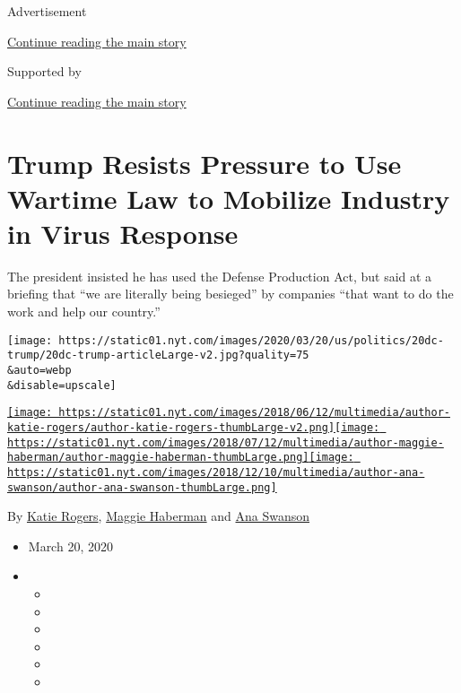 Advertisement

\protect\hyperlink{after-top}{Continue reading the main story}

Supported by

\protect\hyperlink{after-sponsor}{Continue reading the main story}

\hypertarget{trump-resists-pressure-to-use-wartime-law-to-mobilize-industry-in-virus-response}{%
\section{Trump Resists Pressure to Use Wartime Law to Mobilize Industry
in Virus
Response}\label{trump-resists-pressure-to-use-wartime-law-to-mobilize-industry-in-virus-response}}

The president insisted he has used the Defense Production Act, but said
at a briefing that ``we are literally being besieged'' by companies
``that want to do the work and help our country.''

\texttt{[image: https://static01.nyt.com/images/2020/03/20/us/politics/20dc-trump/20dc-trump-articleLarge-v2.jpg?quality=75\\\&auto=webp\\\&disable=upscale]}

\href{https://www.nytimes.com/by/katie-rogers}{\texttt{[image: https://static01.nyt.com/images/2018/06/12/multimedia/author-katie-rogers/author-katie-rogers-thumbLarge-v2.png]}}\href{https://www.nytimes.com/by/maggie-haberman}{\texttt{[image: https://static01.nyt.com/images/2018/07/12/multimedia/author-maggie-haberman/author-maggie-haberman-thumbLarge.png]}}\href{https://www.nytimes.com/by/ana-swanson}{\texttt{[image: https://static01.nyt.com/images/2018/12/10/multimedia/author-ana-swanson/author-ana-swanson-thumbLarge.png]}}

By \href{https://www.nytimes.com/by/katie-rogers}{Katie Rogers},
\href{https://www.nytimes.com/by/maggie-haberman}{Maggie Haberman} and
\href{https://www.nytimes.com/by/ana-swanson}{Ana Swanson}

\begin{itemize}
\item
  March 20, 2020
\item
  \begin{itemize}
  \item
  \item
  \item
  \item
  \item
  \item
  \end{itemize}
\end{itemize}

